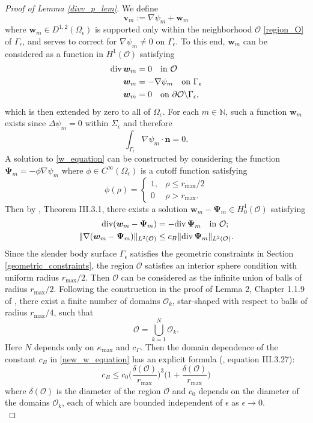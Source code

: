 \documentclass[11pt]{article}
\numberwithin{equation}{section}
\newcommand{\N}{\mathbb{N}}
\newcommand{\bw}{\bm{w}}
\newcommand{\bv}{\bm{v}}
\newcommand{\p}{\partial}
\newcommand{\ts}{\thinspace}
\newcommand{\dive}{{\rm{div}}}
\theoremstyle{definition}
\begin{document}
\begin{proof}[Proof of Lemma \ref{divv_p_lem}]
We define
\[ \bv_m :=\nabla \psi_m+\bw_m \]
where $\bw_m\in D^{1,2}(\Omega_{\epsilon})$ is supported only within the neighborhood $\mathcal{O}$ \eqref{region_O} of $\Gamma_{\epsilon}$, and serves to correct for $\nabla \psi_m\neq 0$ on $\Gamma_{\epsilon}$. To this end, $\bw_m$ can be considered as a function in $H^1(\mathcal{O})$ satisfying
\begin{equation}\label{w_equation}
\begin{aligned}
\dive\ts\bw_m &= 0 \quad \text{in }\mathcal{O} \\
\bw_m &= - \nabla \psi_m \quad \text{on }\Gamma_{\epsilon} \\
\bw_m &=0 \quad \text{on } \p \mathcal{O} \backslash\Gamma_{\epsilon}, 
\end{aligned}
\end{equation}
which is then extended by zero to all of $\Omega_{\epsilon}$. For each $m\in \N$, such a function $\bw_m$ exists since $\Delta \psi_m=0$ within $\Sigma_{\epsilon}$ and therefore
\[ \int_{\Gamma_{\epsilon}} \nabla \psi_m\cdot{\bm n}=0. \]
A solution to \eqref{w_equation} can be constructed by considering the function ${\bm \Psi}_m = - \phi\nabla \psi_m$ where $\phi\in C^{\infty}(\Omega_{\epsilon})$ is a cutoff function satisfying 
\[ \phi(\rho)=\begin{cases}
1, & \rho \le r_{\max}/2 \\
0 & \rho > r_{\max}.
\end{cases} \] 
Then by \cite{galdi2011introduction}, Theorem III.3.1, there exists a solution $\bw_m-{\bm \Psi}_m\in H^1_0(\mathcal{O})$ satisfying
\begin{equation}\label{new_w_equation}
\begin{aligned}
\dive(\bw_m-{\bm \Psi}_m) &= -\dive \ts {\bm \Psi}_m \quad \text{in }\mathcal{O}; \\
\|\nabla(\bw_m-{\bm \Psi}_m)\|_{L^2(\mathcal{O})} &\le c_B\|\dive \ts {\bm \Psi}_m\|_{L^2(\mathcal{O})}.
\end{aligned}
\end{equation}
Since the slender body surface $\Gamma_{\epsilon}$ satisfies the geometric constraints in Section \ref{geometric_constraints}, the region $\mathcal{O}$ satisfies an interior sphere condition with uniform radius $r_{\max}/2$. Then $\mathcal{O}$ can be considered as the infinite union of balls of radius $r_{\max}/2$. Following the construction in the proof of Lemma 2, Chapter 1.1.9 of \cite{maz2013sobolev}, there exist a finite number of domains $\mathcal{O}_k$, star-shaped with respect to balls of radius $r_{\max}/4$, such that
\[\mathcal{O} = \bigcup_{k=1}^N \mathcal{O}_k. \]
Here $N$ depends only on $\kappa_{\max}$ and $c_\Gamma$. Then the domain dependence of the constant $c_B$ in \eqref{new_w_equation} has an explicit formula (\cite{galdi2011introduction}, equation III.3.27): 
\[ c_B \le c_0 \bigg(\frac{\delta(\mathcal{O})}{r_{\max}} \bigg)^3\bigg(1+ \frac{\delta(\mathcal{O})}{r_{\max}} \bigg) \]
where $\delta(\mathcal{O})$ is the diameter of the region $\mathcal{O}$ and $c_0$ depends on the diameter of the domains $\mathcal{O}_k$, each of which are bounded independent of $\epsilon$ as $\epsilon\to 0$. \\


\end{proof}
\end{document}
